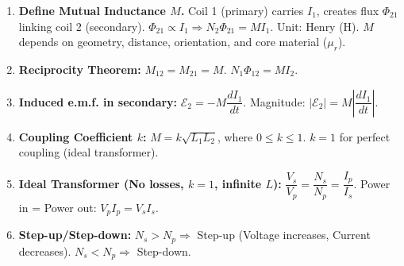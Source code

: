 \documentclass[11pt]{article}
\begin{document}
\begin{methode}
\begin{enumerate}
\item \textbf{Define Mutual Inductance $M$.} Coil 1 (primary) carries $I_1$, creates flux $\Phi_{21}$ linking coil 2 (secondary). $\Phi_{21} \propto I_1 \Rightarrow N_2\Phi_{21} = M I_1$. Unit: Henry (H). $M$ depends on geometry, distance, orientation, and core material ($\mu_r$).
\item \textbf{Reciprocity Theorem:} $M_{12} = M_{21} = M$. $N_1\Phi_{12} = M I_2$.
\item \textbf{Induced e.m.f. in secondary:} $\mathcal{E}_2 = -M \dfrac{dI_1}{dt}$. Magnitude: $|\mathcal{E}_2| = M \left|\dfrac{dI_1}{dt}\right|$.
\item \textbf{Coupling Coefficient $k$:} $M = k\sqrt{L_1 L_2}$, where $0 \le k \le 1$. $k=1$ for perfect coupling (ideal transformer).
\item \textbf{Ideal Transformer (No losses, $k=1$, infinite $L$):} $\dfrac{V_s}{V_p} = \dfrac{N_s}{N_p} = \dfrac{I_p}{I_s}$. Power in = Power out: $V_p I_p = V_s I_s$.
\item \textbf{Step-up/Step-down:} $N_s > N_p \Rightarrow$ Step-up (Voltage increases, Current decreases). $N_s < N_p \Rightarrow$ Step-down.
\end{enumerate}
\end{methode}
\end{document}
